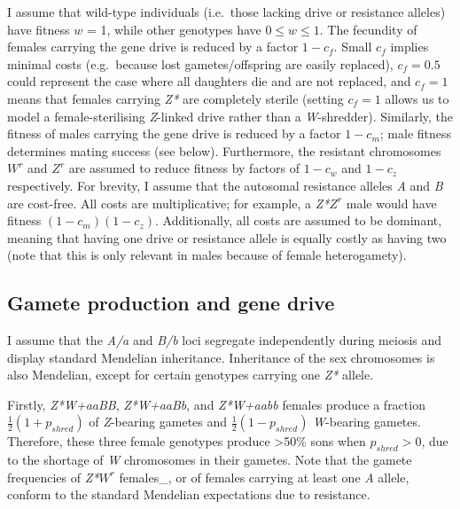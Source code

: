 \documentclass[]{rsos}%
\begin{document}
I assume that wild-type individuals (i.e.~those lacking drive or
resistance alleles) have fitness \(w\) = 1, while other genotypes have
\(0 \le w \le 1\). The fecundity of females carrying the gene drive is
reduced by a factor \(1 - c_f\). Small \(c_f\) implies minimal costs
(e.g.~because lost gametes/offspring are easily replaced), \(c_f = 0.5\)
could represent the case where all daughters die and are not replaced,
and \(c_f = 1\) means that females carrying \emph{Z*} are completely
sterile (setting \(c_f = 1\) allows us to model a female-sterilising
\emph{Z}-linked drive rather than a \emph{W}-shredder). Similarly, the
fitness of males carrying the gene drive is reduced by a factor
\(1 - c_m\); male fitness determines mating success (see below).
Furthermore, the resistant chromosomes \(W^r\) and \(Z^r\) are assumed
to reduce fitness by factors of \(1 - c_w\) and \(1 - c_z\)
respectively. For brevity, I assume that the autosomal resistance
alleles \emph{A} and \emph{B} are cost-free. All costs are
multiplicative; for example, a \emph{Z*}\(Z^r\) male would have fitness
\((1 - c_m)(1 - c_z)\). Additionally, all costs are assumed to be
dominant, meaning that having one drive or resistance allele is equally
costly as having two (note that this is only relevant in males because
of female heterogamety).

\hypertarget{gamete-production-and-gene-drive}{%
\subsection{Gamete production and gene
drive}\label{gamete-production-and-gene-drive}}

I assume that the \emph{A/a} and \emph{B/b} loci segregate independently
during meiosis and display standard Mendelian inheritance. Inheritance
of the sex chromosomes is also Mendelian, except for certain genotypes
carrying one \emph{Z*} allele.

Firstly, \emph{Z*W+aaBB}, \emph{Z*W+aaBb}, and \emph{Z*W+aabb} females
produce a fraction \(\frac{1}{2}(1 + p_{shred})\) of \emph{Z}-bearing
gametes and \(\frac{1}{2}(1 - p_{shred})\) \emph{W}-bearing gametes.
Therefore, these three female genotypes produce \textgreater{}50\% sons
when \(p_{shred} > 0\), due to the shortage of \emph{W} chromosomes in
their gametes. Note that the gamete frequencies of \emph{Z*}\(W^r\)
females\_, or of females carrying at least one \emph{A} allele, conform
to the standard Mendelian expectations due to resistance.
\end{document}

